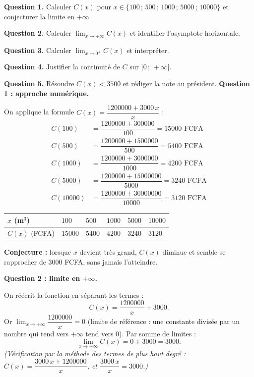 \documentclass[11pt]{article}
\begin{document}
\begin{exoresolu}
\textbf{Question 1.} Calculer $C(x)$ pour $x \in \{100\,;\,500\,;\,\num{1000}\,;\,\num{5000}\,;\,\num{10000}\}$ et conjecturer la limite en $+\infty$.

\textbf{Question 2.} Calculer $\displaystyle\lim_{x \to +\infty} C(x)$ et identifier l'asymptote horizontale.

\textbf{Question 3.} Calculer $\displaystyle\lim_{x \to 0^+} C(x)$ et interpréter.

\textbf{Question 4.} Justifier la continuité de $C$ sur $]0\,;\,+\infty[$.

\textbf{Question 5.} Résoudre $C(x) < \num{3500}$ et rédiger la note au président.
\tcblower
\textbf{Question 1 : approche numérique.}

On applique la formule $C(x) = \dfrac{\num{1200000} + \num{3000}\,x}{x}$ :
\begin{align*}
C(100) &= \dfrac{\num{1200000} + \num{300000}}{100} = \num{15000} \text{ FCFA} \\
C(500) &= \dfrac{\num{1200000} + \num{1500000}}{500} = \num{5400} \text{ FCFA} \\
C(\num{1000}) &= \dfrac{\num{1200000} + \num{3000000}}{\num{1000}} = \num{4200} \text{ FCFA} \\
C(\num{5000}) &= \dfrac{\num{1200000} + \num{15000000}}{\num{5000}} = \num{3240} \text{ FCFA} \\
C(\num{10000}) &= \dfrac{\num{1200000} + \num{30000000}}{\num{10000}} = \num{3120} \text{ FCFA}
\end{align*}

\begin{center}
\begin{tabularx}{\linewidth}{|l|X|X|X|X|X|}
\hline
\rowcolor{popblueL} $x$ (m$^3$) & $100$ & $500$ & $\num{1000}$ & $\num{5000}$ & $\num{10000}$ \\
\hline $C(x)$ (FCFA) & $\num{15000}$ & $\num{5400}$ & $\num{4200}$ & $\num{3240}$ & $\num{3120}$ \\
\hline
\end{tabularx}
\end{center}

\textbf{Conjecture :} lorsque $x$ devient très grand, $C(x)$ diminue et semble se rapprocher de $\num{3000}$ FCFA, sans jamais l'atteindre.

\textbf{Question 2 : limite en $+\infty$.}

On réécrit la fonction en séparant les termes :
\[ C(x) = \dfrac{\num{1200000}}{x} + \num{3000}. \]
Or $\displaystyle\lim_{x \to +\infty} \dfrac{\num{1200000}}{x} = 0$ (limite de référence : une constante divisée par un nombre qui tend vers $+\infty$ tend vers $0$). Par somme de limites :
\[ \lim_{x \to +\infty} C(x) = 0 + \num{3000} = \num{3000}. \]
\textit{(Vérification par la méthode des termes de plus haut degré : $C(x) = \dfrac{\num{3000}\,x + \num{1200000}}{x}$, et $\dfrac{\num{3000}\,x}{x} = \num{3000}$.)}


\end{exoresolu}
\end{document}
